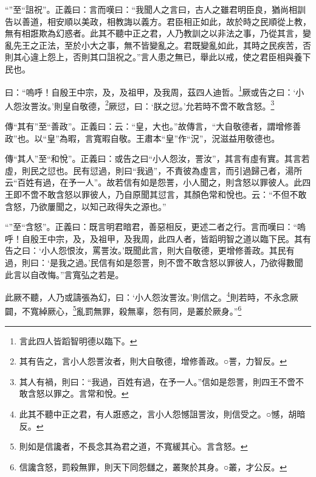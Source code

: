 {\noindent\shu{}\fzkt “”至“詛祝”。正義曰：言而嘆曰：“我聞人之言曰，古人之雖君明臣良，猶尚相訓告以善道，相安順以美政，相教誨以義方。君臣相正如此，故於時之民順從上教，無有相誑欺為幻惑者。此其不聽中正之君，人乃教訓之以非法之事，乃從其言，變亂先王之正法，至於小大之事，無不皆變亂之。君既變亂如此，其時之民疾苦，否則其心違上怨上，否則其口詛祝之。”言人患之無已，舉此以戒，使之君臣相與養下民也。 \par}

曰：“嗚呼！自殷王中宗，及，及祖甲，及我周，茲四人迪哲。\footnote{言此四人皆蹈智明德以臨下。}厥或告之曰：‘小人怨汝詈汝。’則皇自敬德，\footnote{其有告之，言小人怨詈汝者，則大自敬德，增修善政。○詈，力智反。}厥愆，曰：‘朕之愆。’允若時不啻不敢含怒。\footnote{其人有禍，則曰：“我過，百姓有過，在予一人。”信如是怨詈，則四王不啻不敢含怒以罪之。言常和悅。}


{\noindent\zhuan{}\fzbyks 傳“其有”至“善政”。正義曰：云：“皇，大也。”故傳言，“大自敬德者，謂增修善政”也。以“皇”為暇，言寬暇自敬。王肅本“皇”作“況”，況滋益用敬德也。 \par}

{\noindent\zhuan{}\fzbyks 傳“其人”至“和悅”。正義曰：或告之曰“小人怨汝，詈汝”，其言有虛有實。其言若虛，則民之愆也。民有愆過，則曰“我過”，不責彼為虛言，而引過歸己者，湯所云“百姓有過，在予一人”。故若信有如是怨詈，小人聞之，則含怒以罪彼人。此四王即不啻不敢含怒以罪彼人，乃自原聞其愆言，其顏色常和悅也。云：“不但不敢含怒，乃欲屢聞之，以知己政得失之源也。” \par}

{\noindent\shu{}\fzkt “”至“含怒”。正義曰：既言明君暗君，善惡相反，更述二者之行。言而嘆曰：“嗚呼！自殷王中宗，及，及祖甲，及我周，此四人者，皆蹈明智之道以臨下民。其有告之曰：‘小人怨恨汝，罵詈汝。’既聞此言，則大自敬德，更增修善政。其民有過，則曰：‘是我之過。’民信有如是怨詈，則不啻不敢含怒以罪彼人，乃欲得數聞此言以自改悔。”言寬弘之若是。 \par}

此厥不聽，人乃或譸張為幻，曰：‘小人怨汝詈汝。’則信之。\footnote{此其不聽中正之君，有人誑惑之，言小人怨憾詛詈汝，則信受之。○憾，胡暗反。}則若時，不永念厥闢，不寬綽厥心，\footnote{則如是信讒者，不長念其為君之道，不寬緩其心。言含怒。}亂罰無罪，殺無辜，怨有同，是叢於厥身。”\footnote{信讒含怒，罰殺無罪，則天下同怨讎之，叢聚於其身。○叢，才公反。}


